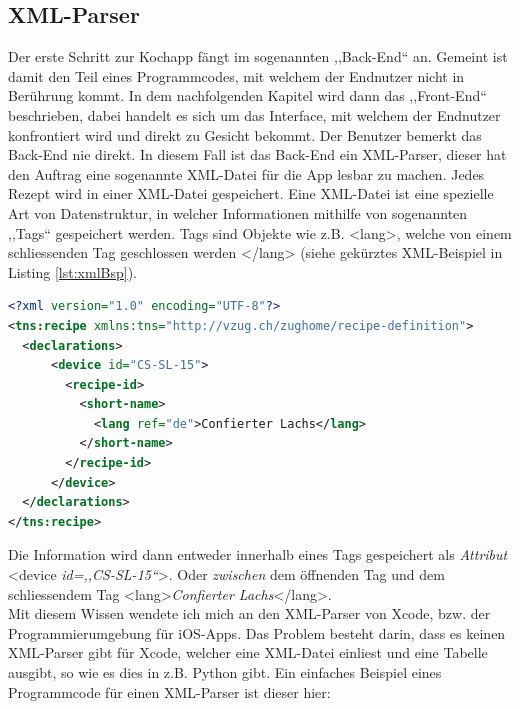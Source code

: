 \documentclass[12pt]{article}
\begin{document}
\subsection{XML-Parser}
Der erste Schritt zur Kochapp fängt im sogenannten ,,Back-End`` an. Gemeint ist damit den Teil eines Programmcodes, mit welchem der Endnutzer nicht in Berührung kommt. In dem nachfolgenden Kapitel wird dann das ,,Front-End`` beschrieben, dabei handelt es sich um das Interface, mit welchem der Endnutzer konfrontiert wird und direkt zu Gesicht bekommt. Der Benutzer bemerkt das Back-End nie direkt. In diesem Fall ist das Back-End ein XML-Parser, dieser hat den Auftrag eine sogenannte XML-Datei für die App lesbar zu machen. Jedes Rezept wird in einer XML-Datei gespeichert. Eine XML-Datei ist eine spezielle Art von Datenstruktur, in welcher Informationen mithilfe von sogenannten ,,Tags`` gespeichert werden. Tags sind Objekte wie z.B. \colorbox{backcolour}{<lang>}, welche von einem schliessenden Tag geschlossen werden \colorbox{backcolour}{</lang>} (siehe gekürztes XML-Beispiel in Listing \ref{lst:xmlBsp}). \cite{bray2000extensible}
\begin{lstlisting}[language=XML,caption={XML-Beispiel gekürzt, Quelle: VZUG AG},label={lst:xmlBsp}]
<?xml version="1.0" encoding="UTF-8"?>
<tns:recipe xmlns:tns="http://vzug.ch/zughome/recipe-definition">
  <declarations>
      <device id="CS-SL-15">
        <recipe-id>
          <short-name>
            <lang ref="de">Confierter Lachs</lang>
          </short-name>
        </recipe-id>
      </device>
  </declarations>
</tns:recipe>
\end{lstlisting}
Die Information wird dann entweder innerhalb eines Tags gespeichert als \textit{Attribut} \colorbox{backcolour}{<device \textit{id=,,CS-SL-15``}>}. Oder \textit{zwischen} dem öffnenden Tag und dem schliessendem Tag \colorbox{backcolour}{<lang>\textit{Confierter Lachs}</lang>}. \\ Mit diesem Wissen wendete ich mich an den XML-Parser von Xcode, bzw. der Programmierumgebung für iOS-Apps. Das Problem besteht darin, dass es keinen XML-Parser gibt für Xcode, welcher eine XML-Datei einliest und eine Tabelle ausgibt, so wie es dies in z.B. Python gibt. Ein einfaches Beispiel eines Programmcode für einen XML-Parser ist dieser hier:
\end{document}
